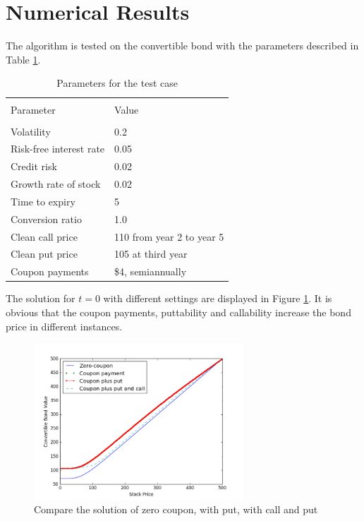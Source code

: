 \documentclass[12pt]{article}
\begin{document}
\section{Numerical Results}
The algorithm is tested on the convertible bond with the parameters described in Table \ref{tb:params}.
\begin{table}
\centering
\begin{tabular}{ll}
\hline\hline\\
Parameter &  Value \\
\hline\\
Volatility & 0.2 \\
Risk-free interest rate & 0.05\\
Credit risk & 0.02\\
Growth rate of stock & 0.02\\
Time to expiry & 5 \\
Conversion ratio & 1.0 \\
Clean call price & 110 from year 2 to year 5\\
Clean put price & 105 at third year\\
Coupon payments & \$4, semiannually\\
\hline
\end{tabular}
\caption{Parameters for the test case}
\label{tb:params}
\end{table}


The solution for $t = 0$ with different settings are displayed in Figure \ref{fig:compare}. It is obvious that the coupon payments, puttability and callability increase the bond price in different instances.
\begin{figure}[ht]
\centering
\includegraphics[width=0.7\textwidth]{Figures/compare}
\caption{Compare the solution of zero coupon, with put, with call and put}
\label{fig:compare}
\end{figure}
\end{document}
